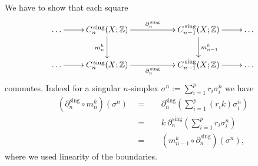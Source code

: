 \documentclass[11pt]{book}
\numberwithin{dummy}{section}
\theoremstyle{nonumberbreak}
\newenvironment{sol}[1][]{\ifthenelse{\equal{#1}{}}{\solution}{\solution[#1]}\rm}{\endsolution}
\newenvironment{prob}[1][]{\ifthenelse{\equal{#1}{}}{\problem}{\problem[#1]}\rm}{\endproblem}
\newcommand{\Z}{\mathbb{Z}}
\newcommand{\Cs}{C^{\hspace{1pt}\mathrm{sing}}}
\newcommand{\parts}{\partial^{\hspace{1pt} \mathrm{sing}}}
\begin{document}
\begin{spacing}{1.4}
\begin{prob}
\begin{sol}
\begin{compactenum}
\item We have to show that each square
$$
\begin{xy}
\xymatrix{
\ldots \ar[r] & \Cs_n(X;\Z) \ar[d]_{m^k_n} \ar[rr]^{\parts_n} && \Cs_{n-1}(X;\Z) \ar[d]^{m^k_{n-1}} \ar[r] & \ldots \\
\ldots \ar[r] & \Cs_n(X;\Z) \ar[rr]_{\parts_n} && \Cs_{n-1}(X;\Z) \ar[r] & \ldots
}
\end{xy}
$$
commutes. Indeed for a singular $n$-simplex $\sigma^n := \sum_{i=1}^p r_i \sigma_i^n$ we have 
\begin{alignat*}{5}
\left( \parts_n \circ m^k_n\right)(\sigma^n) \ \ &=&& \ \ \partial_n^{\mathrm{sing}} \left( \sum_{i=1}^p (r_ik) \sigma_i^n\right) \\
&=&& \ \ k \ \parts_n \left( \sum_{i=1}^p  r_i \sigma_i^n\right) \\
&=&& \ \ \left( m^k_{n-1} \circ \parts_n\right) \left( \sigma^n\right),
\end{alignat*}
where we used linearity of the boundaries.


\end{compactenum}
\end{sol}
\end{prob}
\end{spacing}
\end{document}
